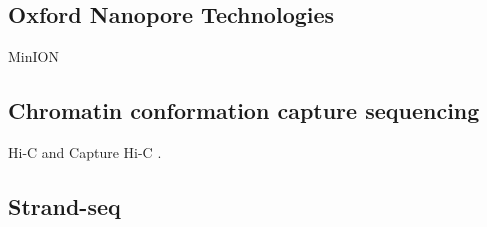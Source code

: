 
\subsection{Oxford Nanopore Technologies\texorpdfstring{\textsuperscript{\textregistered}}{{R}}}
\label{sec:ont}
MinION\textregistered


\subsection{Chromatin conformation capture sequencing}
\label{sec:ccc}

Hi-C \citep{Lieberman-Aiden2009} and Capture Hi-C \citep{Dryden2014,Schoenfelder2015,Jager2015,Mifsud2015}.

\subsection{Strand-seq}
\label{sec:strandseq}


